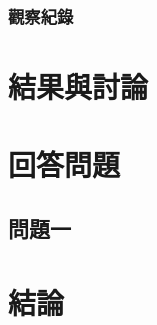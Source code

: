 \documentclass[twocolumn]{article}
\begin{document}
\subsubsection*{觀察紀錄}

\section{結果與討論}












\section{回答問題}

\newcommand\question[1]{
  \fbox{\parbox{\dimexpr\linewidth - 2\fboxrule - 2\fboxsep}{#1}}\vspace{2mm}
}

\subsection{問題一}\label{Q1}

\question{
}

\section{結論}



\end{document}

